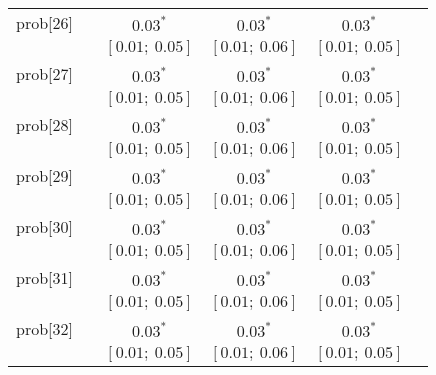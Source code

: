 \begin{table}
\begin{center}
\begin{tabular}{l c c c c c }
prob[26]    &                                  & $0.03^{*}$                & $0.03^{*}$                & $0.03^{*}$              &                         \\
            &                                  & $[0.01;\ 0.05]$           & $[0.01;\ 0.06]$           & $[0.01;\ 0.05]$         &                         \\
prob[27]    &                                  & $0.03^{*}$                & $0.03^{*}$                & $0.03^{*}$              &                         \\
            &                                  & $[0.01;\ 0.05]$           & $[0.01;\ 0.06]$           & $[0.01;\ 0.05]$         &                         \\
prob[28]    &                                  & $0.03^{*}$                & $0.03^{*}$                & $0.03^{*}$              &                         \\
            &                                  & $[0.01;\ 0.05]$           & $[0.01;\ 0.06]$           & $[0.01;\ 0.05]$         &                         \\
prob[29]    &                                  & $0.03^{*}$                & $0.03^{*}$                & $0.03^{*}$              &                         \\
            &                                  & $[0.01;\ 0.05]$           & $[0.01;\ 0.06]$           & $[0.01;\ 0.05]$         &                         \\
prob[30]    &                                  & $0.03^{*}$                & $0.03^{*}$                & $0.03^{*}$              &                         \\
            &                                  & $[0.01;\ 0.05]$           & $[0.01;\ 0.06]$           & $[0.01;\ 0.05]$         &                         \\
prob[31]    &                                  & $0.03^{*}$                & $0.03^{*}$                & $0.03^{*}$              &                         \\
            &                                  & $[0.01;\ 0.05]$           & $[0.01;\ 0.06]$           & $[0.01;\ 0.05]$         &                         \\
prob[32]    &                                  & $0.03^{*}$                & $0.03^{*}$                & $0.03^{*}$              &                         \\
            &                                  & $[0.01;\ 0.05]$           & $[0.01;\ 0.06]$           & $[0.01;\ 0.05]$         &                         \\

\end{tabular}
\end{center}
\end{table}
